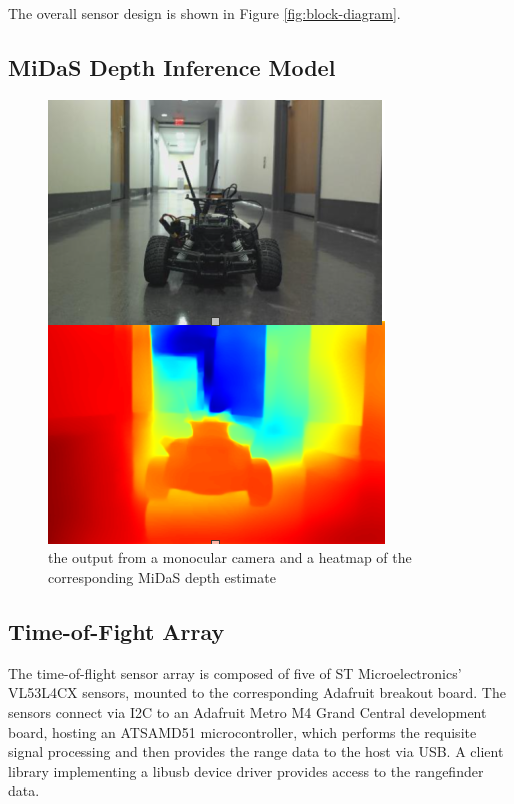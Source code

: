 \documentclass[conference]{IEEEtran}
\begin{document}
The overall sensor design is shown in Figure \ref{fig:block-diagram}.

\FloatBarrier

\subsection{MiDaS Depth Inference Model}
\begin{figure}
\centering
\includegraphics[scale=0.65]{midas-heatmap.png}
\caption{the output from a monocular camera and a heatmap of the corresponding
         MiDaS depth estimate}
\label{fig:midas-heatmap}
\end{figure}

\FloatBarrier
\subsection{Time-of-Fight Array}
The time-of-flight sensor array is composed of five of ST Microelectronics'
VL53L4CX sensors, mounted to the corresponding Adafruit breakout board. The
sensors connect via I2C to an Adafruit Metro M4 Grand Central development
board, hosting an ATSAMD51 microcontroller, which performs the requisite signal
processing and then provides the range data to the host via USB. A client
library implementing a libusb device driver provides access to the rangefinder
data.
\end{document}
